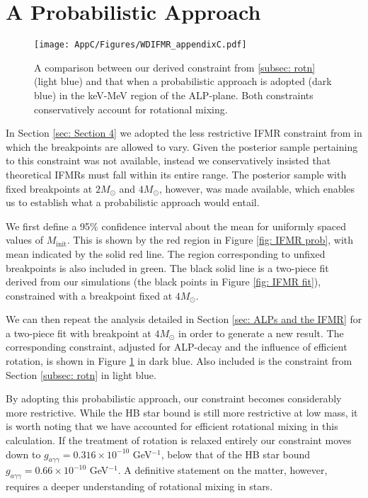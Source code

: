 \section{A Probabilistic Approach}
\label{sec: AppD}

\begin{figure}[t]
    \centering
    \texttt{[image: AppC/Figures/WDIFMR\_appendixC.pdf]}
    \caption{A comparison between our derived constraint from \ref{subsec: rotn} (light blue) and that when a probabilistic approach is adopted (dark blue) in the keV-MeV region of the ALP-plane. Both constraints conservatively account for rotational mixing.}
    \label{fig: Prob constraint}
\end{figure}

In Section \ref{sec: Section 4} we adopted the less restrictive IFMR constraint from \cite{Andrews} in which the breakpoints are allowed to vary. Given the posterior sample pertaining to this constraint was not available, instead we conservatively insisted that theoretical IFMRs must fall within its entire range. The posterior sample with fixed breakpoints at $2M_{\odot}$ and $4M_{\odot}$, however, was made available, which enables us to establish what a probabilistic approach would entail.



We first define a 95\% confidence interval about the mean for uniformly spaced values of $M_{\mathrm{init}}$. This is shown by the red region in Figure \ref{fig: IFMR prob}, with mean indicated by the solid red line. The region corresponding to unfixed breakpoints is also included in green. The black solid line is a two-piece fit derived from our simulations (the black points in Figure \ref{fig: IFMR fit}), constrained with a breakpoint fixed at $4M_{\odot}$.


We can then repeat the analysis detailed in Section \ref{sec: ALPs and the IFMR} for a two-piece fit with breakpoint at $4M_{\odot}$ in order to generate a new result. The corresponding constraint, adjusted for ALP-decay and the influence of efficient rotation, is shown in Figure \ref{fig: Prob constraint} in dark blue. Also included is the constraint from Section \ref{subsec: rotn} in light blue.



By adopting this probabilistic approach, our constraint becomes considerably more restrictive. While the HB star bound is still more restrictive at low mass, it is worth noting that we have accounted for efficient rotational mixing in this calculation. If the treatment of rotation is relaxed entirely our constraint moves down to $g_{a\gamma\gamma}=0.316\times10^{-10}$ GeV$^{-1}$, below that of the HB star bound $g_{a\gamma\gamma}=0.66\times10^{-10}$ GeV$^{-1}$. A definitive statement on the matter, however, requires a deeper understanding of rotational mixing in stars.





